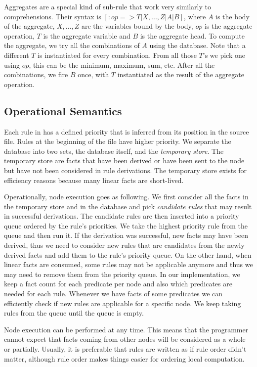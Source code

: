 Aggregates are a special kind of sub-rule that work very similarly to comprehensions. Their syntax is $[:op => T | X, ..., Z | A | B]$, where $A$ is the body of the aggregate, $X, ..., Z$ are the variables bound by the body, $op$ is the aggregate operation, $T$ is the aggregate variable and $B$ is the aggregate head. To compute the aggregate, we try all the combinations of $A$ using the database. Note that a different $T$ is instantiated for every combination. From all those $T$'s we pick one using $op$, this can be the minimum, maximum, sum, etc. After all the combinations, we fire $B$ once, with $T$ instantiated as the result of the aggregate operation.

\subsection{Operational Semantics}

Each rule in \lang has a defined priority that is inferred from its position in the source file. Rules at the beginning of the file have higher priority. We separate the database into two sets,
the database itself, and the \emph{temporary store}. The temporary store are facts that have been
derived or have been sent to the node but have not been considered in rule derivations.
The temporary store exists for efficiency reasons because many linear facts are short-lived.

Operationally, node execution goes as following. We first consider all the facts in the
temporary store and in the database and pick \emph{candidate rules} that may result in
successful derivations. The candidate rules are then inserted into a priority queue ordered
by the rule's priorities. We take the highest priority rule from the queue and then run it.
If the derivation was successful, new facts may have been derived, thus we need to consider new
rules that are candidates from the newly derived facts and add them to the rule's priority queue.
On the other hand, when linear facts are consumed, some rules may not be applicable anymore and thus
we may need to remove them from the priority queue. In our implementation,
we keep a fact count for each predicate per node and also which predicates are needed for each rule. Whenever we have facts of some
predicates we can efficiently check if new rules are applicable for a specific node. We keep taking rules from the
queue until the queue is empty.

Node execution can be performed at any time. This means that the programmer cannot expect
that facts coming from other nodes will be considered as a whole or partially.
Usually, it is preferable that rules are written as if rule order didn't matter, although
rule order makes things easier for ordering local computation.


